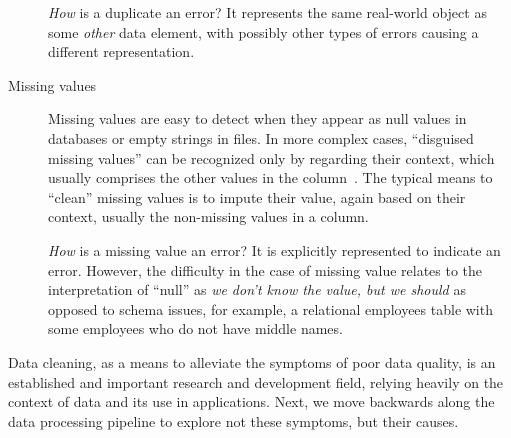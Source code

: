 \begin{description}
  \emph{How} is a duplicate an error? It represents the same real-world object as some \emph{other} data element, with possibly other types of errors causing a different representation.
  
  \item[Missing values] Missing values are easy to detect when they appear as null values in databases or empty strings in files. In more complex cases, ``disguised missing values'' can be recognized only by regarding their context, which usually comprises the other values in the column~\cite{FAHES_18}. 
  The typical means to ``clean'' missing values is to impute their value, again based on their context, usually the non-missing values in a column.
  
  \emph{How} is a missing value an error? It is explicitly represented to indicate an error. However, the difficulty in the case of missing value relates to the interpretation of ``null'' as {\em we don't know the value, but we should} as opposed to schema issues, for example, a relational employees table with some employees who do not have middle names.
\end{description}

Data cleaning, as a means to alleviate the symptoms of poor data quality, is an established and important research and development field, relying heavily on the context of data and its use in applications. Next, we move backwards along the data processing pipeline to explore not these symptoms, but their causes.